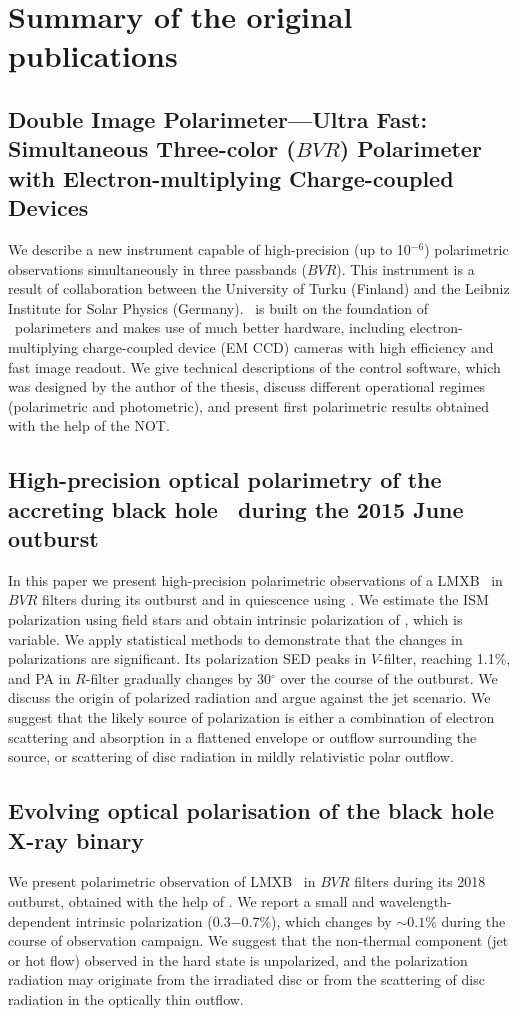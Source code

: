 \chapter{Summary of the original publications}
\let\oldsection\thesection
\renewcommand{\thesection}{\Roman{section}} 

\section{Double Image Polarimeter—Ultra Fast: Simultaneous Three-color ($BVR$) Polarimeter with Electron-multiplying Charge-coupled Devices }
We describe a new instrument capable of high-precision (up to 10$^{-6}$) polarimetric observations simultaneously in three passbands ($BVR$). 
This instrument is a result of collaboration between the University of Turku (Finland) and the Leibniz Institute for Solar Physics (Germany).
\DUF\ is built on the foundation of \DP\ polarimeters and makes use of much better hardware, including electron-multiplying charge-coupled device (EM CCD) cameras with high efficiency and fast image readout. 
We give technical descriptions of the control software, which was designed by the author of the thesis, discuss different operational regimes (polarimetric and photometric), and present first polarimetric results obtained with the help of the \gls{NOT}.

\section{High-precision optical polarimetry of the accreting black hole \VCYG\ during the 2015 June outburst}
In this paper we present high-precision polarimetric observations of a \gls{LMXB} \VCYG\ in $BVR$ filters during its outburst and in quiescence using \DP. 
We estimate the \gls{ISM} polarization using field stars and obtain intrinsic polarization of \VCYG, which is variable.
We apply statistical methods to demonstrate that the changes in polarizations are significant.
Its polarization \gls{SED} peaks in $V$-filter, reaching 1.1\%, and \gls{PA} in $R$-filter gradually changes by 30$^\circ$ over the course of the outburst.
We discuss the origin of polarized radiation and argue against the jet scenario.
We suggest that the likely source of polarization is either a combination of electron scattering and absorption in a flattened envelope or outflow surrounding the source, or scattering of disc radiation in mildly relativistic polar outflow.

\section{Evolving optical polarisation of the black hole X-ray binary \MAXI}
We present polarimetric observation of \gls{LMXB} \MAXI\ in $BVR$ filters during its 2018 outburst, obtained with the help of \DP.
We report a small and wavelength-dependent intrinsic polarization (0.3$-$0.7\%), which changes by $\sim 0.1\%$ during the course of observation campaign.
We suggest that the non-thermal component (jet or hot flow) observed in the hard state is unpolarized, and the polarization radiation may originate from the irradiated disc or from the scattering of disc radiation in the optically thin outflow.

